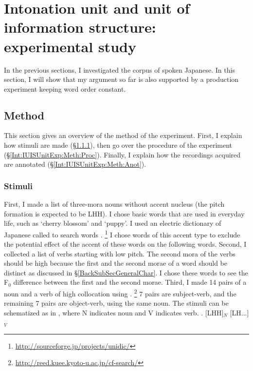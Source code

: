 \section[IU and IS unit: experimental study]{Intonation unit and unit of information structure: experimental study}\label{Int:IUISUnitExp}

In the previous sections,
I investigated the corpus of spoken Japanese.
In this section,
I will show that my argument so far is also supported by a production experiment keeping word order constant.


\subsection{Method}\label{Int:IUISUnitExp:Meth}

This section gives an overview of the method of the experiment.
First, I explain how stimuli are made (\S \ref{Int:IUISUnitExp:Meth:Sti}),
then go over the procedure of the experiment (\S \ref{Int:IUISUnitExp:Meth:Proc}).
Finally,
I explain how the recordings acquired are annotated (\S \ref{Int:IUISUnitExp:Meth:Anot}).

\subsubsection{Stimuli}\label{Int:IUISUnitExp:Meth:Sti}

First, I made a list of three-mora nouns without accent nucleus (the pitch formation is expected to be LHH).
I chose basic words that are used in everyday life,
such as  `cherry blossom' and  `puppy'.
I used an electric dictionary of Japanese called 
to search words
\cite{denetal02,denetal07}.%
	\footnote{\url{http://sourceforge.jp/projects/unidic/}}
I chose words of this accent type to
exclude the potential effect of the accent of these words on the following words.
Second, I collected a list of verbs starting with low pitch.
The second mora of the verbs should be high because the first and the second morae of a word should be distinct as discussed in \S \ref{BackSubSecGeneralChar}.
I chose these words to see the F$_{0}$ difference between the first
and the second morae.
Third, I made 14 pairs of a noun and a verb of high collocation using  \cite{kawaharakurohashi06b,kawaharakurohashi06}.%
	\footnote{\url{http://reed.kuee.kyoto-u.ac.jp/cf-search/}}
7 pairs are subject-verb, and
the remaining 7 pairs are object-verb,
using the same noun.
The stimuli can be schematized as in \Next,
where N indicates noun and V indicates verb.
%
\ex. [LHH]$_{N}$ [LH...]$_{V}$

